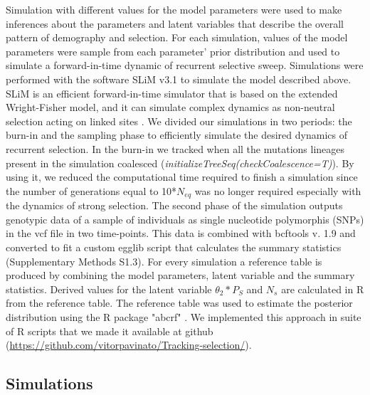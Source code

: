 \documentclass[12pt]{article}
\begin{document}
Simulation with different values for the model parameters were used to make inferences about the parameters and latent variables that describe the overall pattern of demography and selection. For each simulation, values of the model parameters were sample from each parameter' prior distribution and used to simulate a forward-in-time dynamic of recurrent selective sweep. Simulations were performed with  the software SLiM v3.1 \citep{Haller:2017gm, Haller:2018gn} to simulate the model described above. SLiM is an efficient forward-in-time simulator that is based on the extended Wright-Fisher model, and it can simulate complex dynamics as non-neutral selection acting on linked sites \citep{Messer:2013ct}. We divided our simulations in two periods: the burn-in and the sampling phase to efficiently simulate the desired dynamics of recurrent selection. In the burn-in we tracked when all the mutations lineages present in the simulation coalesced (\textit{initializeTreeSeq(checkCoalescence=T)}). By using it, we reduced the computational time required to finish a simulation since the number of generations equal to 10*$N_{eq}$ was no longer required especially with the dynamics of strong selection. The second phase of the simulation outputs genotypic data of a sample of individuals as single nucleotide polymorphis (SNPs) in the vcf file in two time-points. This data is combined with bcftools v. 1.9 and converted to fit a custom egglib script that calculates the summary statistics (Supplementary Methods S1.3). For every simulation a reference table is produced by combining the model parameters, latent variable and the summary statistics. Derived values for the latent variable $\theta_{2}*P_{S}$ and $N_{s}$ are calculated in R from the reference table. The reference table was used to estimate the posterior distribution using the R package "abcrf" \citep{Pudlo:2016il,Raynal:2017wm}. We implemented this approach in suite of R scripts that we made it available at github (\url{https://github.com/vitorpavinato/Tracking-selection/}). 

\subsection*{Simulations}
\end{document}

